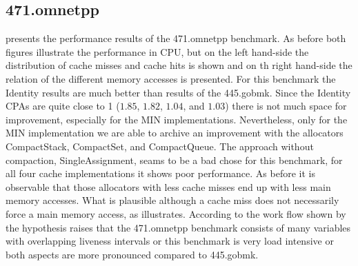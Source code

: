 \documentclass[onecolumn, openright, master, english, signatures]{dbrgrptt}
\begin{document}
\subsection{471.omnetpp}
 presents the performance results of the 471.omnetpp benchmark. As before both figures illustrate the performance in \ac{CPU}, but on the left hand-side the distribution of cache misses and cache hits is shown and on th right hand-side the relation of the different memory accesses is presented. For this benchmark the Identity results are much better than results of the 445.gobmk. Since the Identity \ac{CPA}s are quite close to 1 ($1.85$, $1.82$, $1.04$, and $1.03$) there is not much space for improvement, especially for the \ac{MIN} implementations. Nevertheless, only for the \ac{MIN} implementation we are able to archive an improvement with the allocators CompactStack, CompactSet, and CompactQueue. The approach without compaction, SingleAssignment, seams to be a bad chose for this benchmark, for all four cache implementations it shows poor performance. As before it is observable that those allocators with less cache misses end up with less main memory accesses. What is plausible although a cache miss does not necessarily force a main memory access, as  illustrates. According to the work flow shown by  the hypothesis raises that the 471.omnetpp benchmark consists of many variables with overlapping liveness intervals or this benchmark is very load intensive or both aspects are more pronounced compared to 445.gobmk.
\end{document}
